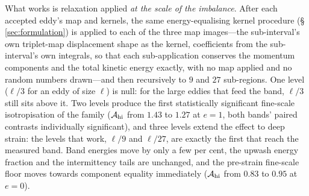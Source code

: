 \documentclass[lineno]{JFM-FLM_Au}
\begin{document}
What works is relaxation applied \emph{at the scale of the imbalance}.
After each accepted eddy's map and kernels, the same energy-equalising
kernel procedure (\S\,\ref{sec:formulation}) is applied to each of the
three map images---the sub-interval's own triplet-map displacement shape
as the kernel, coefficients from the sub-interval's own integrals, so
that each sub-application conserves the momentum components and the total
kinetic energy exactly, with no map applied and no random numbers
drawn---and then recursively to $9$ and $27$ sub-regions. One level
($\ell/3$ for an eddy of size $\ell$) is null: for the large eddies that
feed the band, $\ell/3$ still sits above it. Two levels produce the first
statistically significant fine-scale isotropisation of the family
($\mathcal A_{\rm hi}$ from $1.43$ to $1.27$ at $e=1$, both bands'
paired contrasts individually significant), and three levels extend the
effect to deep strain: the levels that work, $\ell/9$ and $\ell/27$, are
exactly the first that reach the measured band. Band energies move by only a few per cent, the upwash energy fraction and the intermittency tails are unchanged, and the pre-strain
fine-scale floor moves towards component equality immediately
($\mathcal A_{\rm hi}$ from $0.83$ to $0.95$ at $e=0$).
\end{document}
